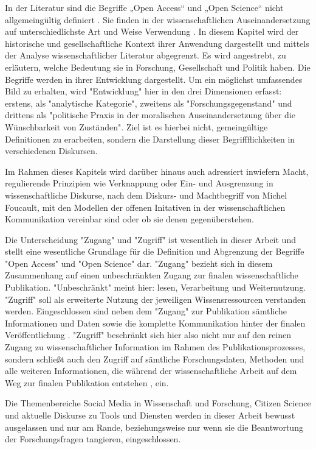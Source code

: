 In der Literatur sind die Begriffe „Open Access“ und „Open Science“ nicht allgemeingültig definiert \cite{suchen}. Sie finden in der wissenschaftlichen Auseinandersetzung auf unterschiedlichste Art und Weise Verwendung \cite{cite:9}. In diesem Kapitel wird der historische und gesellschaftliche Kontext ihrer Anwendung dargestellt und mittels der Analyse wissenschaftlicher Literatur abgegrenzt. Es wird angestrebt, zu erläutern, welche Bedeutung sie in Forschung, Gesellschaft und Politik haben. Die Begriffe werden in ihrer Entwicklung dargestellt. Um ein möglichst umfassendes Bild zu erhalten, wird "Entwicklung" hier in den drei Dimensionen erfasst: erstens, als "analytische Kategorie", zweitens als "Forschungsgegenstand" und drittens als "politische Praxis in der moralischen Auseinandersetzung über die Wünschbarkeit von Zuständen". \cite{cite:10} Ziel ist es hierbei nicht, gemeingültige Definitionen zu erarbeiten, sondern die Darstellung dieser Begriffflichkeiten in verschiedenen Diskursen. 

Im Rahmen dieses Kapitels wird darüber hinaus auch adressiert inwiefern Macht, regulierende Prinzipien wie Verknappung oder Ein- und Ausgrenzung in wissenschaftliche Diskurse, nach dem Diskurs- und Machtbegriff von Michel Foucault, mit den Modellen der offenen Initativen in der wissenschaftlichen Kommunikation vereinbar sind oder ob sie denen gegenüberstehen.

Die Unterscheidung "Zugang" und "Zugriff" ist wesentlich in dieser Arbeit und stellt eine wesentliche Grundlage für die Definition und Abgrenzung der Begriffe "Open Access" und "Open Science" dar. "Zugang" bezieht sich in diesem Zusammenhang auf einen unbeschränkten Zugang zur finalen wissenschaftliche Publikation. "Unbeschränkt" meint hier: lesen\cite{cite:9a}, Verarbeitung und Weiternutzung. "Zugriff" soll als erweiterte Nutzung der jeweiligen Wissensressourcen verstanden werden. Eingeschlossen sind neben dem "Zugang" zur Publikation sämtliche Informationen und Daten sowie die komplette Kommunikation hinter der finalen Veröffentlichung \cite{cite:9b}. "Zugriff" beschränkt sich hier also nicht nur auf den reinen Zugang zu wissenschaftlicher Information im Rahmen des Publikationsprozesses, sondern schließt auch den Zugriff auf sämtliche Forschungsdaten, Methoden und alle weiteren Informationen, die während der wissenschaftliche Arbeit auf dem Weg zur finalen Publikation entstehen \cite{cite:9c}, ein.

Die Themenbereiche Social Media in Wissenschaft und Forschung, Citizen Science und aktuelle Diskurse zu Tools und Diensten werden in dieser Arbeit bewusst ausgelassen und nur am Rande, beziehungsweise nur wenn sie die Beantwortung der Forschungsfragen tangieren, eingeschlossen.

